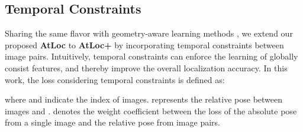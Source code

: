 \documentclass[letterpaper]{article}
\begin{document}
\subsection{Temporal Constraints}
Sharing the same flavor with geometry-aware learning methods \cite{brahmbhatt2018geometry,xue2019local,huang2019prior}, we extend our proposed \textbf{AtLoc} to \textbf{AtLoc+} by incorporating temporal constraints between image pairs. Intuitively, temporal constraints can enforce the learning of globally consist features, and thereby improve the overall localization accuracy. In this work, the loss considering temporal constraints is defined as:

where  and  indicate the index of images.  represents the relative pose between images  and .  denotes the weight coefficient between the loss of the absolute pose from a single image and the relative pose from image pairs.

\begin{table}[t]
    \centering
\caption{\textbf{Camera localization results on 7 Scenes (With temporal Constraints).} For each scene, we compare the median errors in both position and rotation of VidLoc, MapNet and our approach.}
	\label{tbl:7scenes_Seq}
	        \vspace{-0.5cm}
\end{table}
\end{document}

